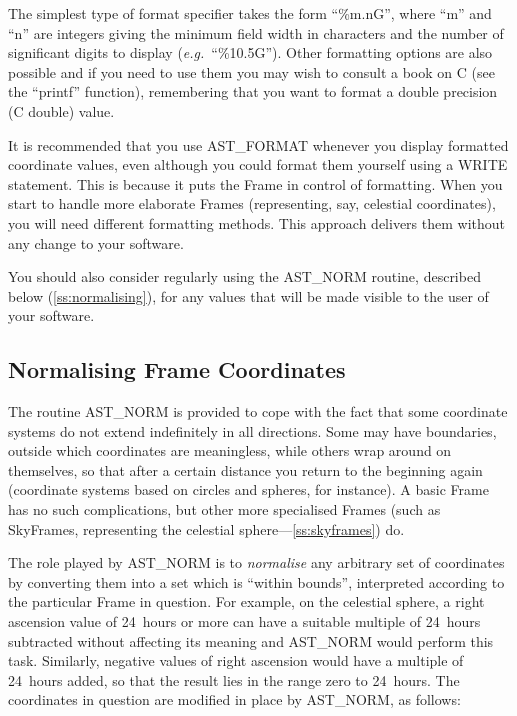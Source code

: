 \documentclass[twoside,11pt]{article}
\newcommand{\htmlref}[2]{#1}
\newcommand{\secref}[1]{\S\ref{#1}}
\renewcommand{\secref}[1]{\ref{#1}}
\begin{document}
The simplest type of format specifier takes the form ``\%m.nG'', where
``m'' and ``n'' are integers giving the minimum field width in
characters and the number of significant digits to display
({\em{e.g.}}\ ``\%10.5G''). Other formatting options are also possible
and if you need to use them you may wish to consult a book on C (see
the ``printf'' function), remembering that you want to format a double
precision (C double) value.

It is recommended that you use AST\_FORMAT whenever you display
formatted coordinate values, even although you could format them
yourself using a WRITE statement. This is because it puts the Frame in
control of formatting. When you start to handle more elaborate Frames
(representing, say, celestial coordinates), you will need different
formatting methods. This approach delivers them without any change to
your software.

You should also consider regularly using the \htmlref{AST\_NORM}{AST_NORM} routine,
described below (\secref{ss:normalising}), for any values that will be
made visible to the user of your software.

\subsection{\label{ss:normalising}Normalising Frame Coordinates}

The routine \htmlref{AST\_NORM}{AST_NORM} is provided to cope with the fact that some
coordinate systems do not extend indefinitely in all directions. Some
may have boundaries, outside which coordinates are meaningless, while
others wrap around on themselves, so that after a certain distance you
return to the beginning again (coordinate systems based on circles and
spheres, for instance). A basic \htmlref{Frame}{Frame} has no such complications, but
other more specialised Frames (such as SkyFrames, representing the
celestial sphere---\secref{ss:skyframes}) do.

The role played by AST\_NORM is to {\em{normalise}} any arbitrary set
of coordinates by converting them into a set which is ``within
bounds'', interpreted according to the particular Frame in
question. For example, on the celestial sphere, a right ascension
value of 24~hours or more can have a suitable multiple of 24~hours
subtracted without affecting its meaning and AST\_NORM would perform
this task. Similarly, negative values of right ascension would have a
multiple of 24~hours added, so that the result lies in the range zero
to 24~hours. The coordinates in question are modified in place by
AST\_NORM, as follows:
\end{document}
